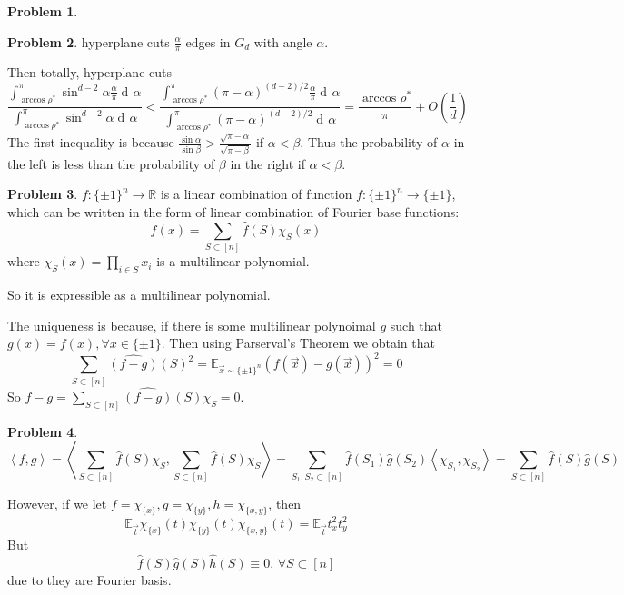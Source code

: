 \documentclass[a4paper]{article}
\theoremstyle{definition}
\newtheorem{problem}{Problem}
\theoremstyle{plain}
\newcommand{\Rbb}{\mathbb R}
\newcommand{\Ebb}{\mathbb E}
\newcommand{\dps}{\displaystyle}
\newcommand{\<}{\left<}
\renewcommand{\>}{\right>}
\numberwithin{equation}{problem}
\DeclareMathOperator{\dd}{d\!}
\begin{document}
\begin{problem}
\end{problem}
\begin{problem}
  hyperplane cuts  $ \frac{\alpha}{\pi} $ edges in  $ G_d $ with angle  $ \alpha $.
  
  Then totally, hyperplane cuts 
  \[\frac{\int_{\arccos\rho^*}^\pi \sin^{d-2}\alpha\frac{\alpha}{\pi}\dd \alpha}{\int_{\arccos\rho^*}^\pi\sin^{d-2}\alpha\dd \alpha}<\frac{\int_{\arccos\rho^*}^\pi(\pi-\alpha)^{(d-2)/2}\frac{\alpha}{\pi}\dd\alpha}{\int_{\arccos\rho^*}^\pi(\pi-\alpha)^{(d-2)/2}\dd \alpha}=\frac{\arccos\rho^*}{\pi}+O(\frac{1}{d})\]
  The first inequality is because  $ \dps\frac{\sin \alpha}{\sin \beta}>\frac{\sqrt{\pi-\alpha}}{\sqrt{\pi-\beta}} $ if  $ \alpha<\beta $. Thus the probability of  $ \alpha $ in the left is less than the probability of  $ \beta $ in the right if  $ \alpha<\beta $.

\end{problem}
\begin{problem}
  $ f:\{\pm 1\}^n\rightarrow \Rbb $ is a linear combination of function  $ f:\{\pm 1\}^n\rightarrow \{\pm 1\} $, which can be written in the form of linear combination of Fourier base functions:
  \[f(x)=\sum_{S\subset [n]}\hat{f}(S)\chi_S(x)\]
  where  $ \dps\chi_S(x)=\prod_{i\in S}x_i $ is a multilinear polynomial.
  
  So it is expressible as a multilinear polynomial.

  The uniqueness is because, if there is some multilinear polynoimal  $ g $ such that  $ g(x)=f(x),\forall x\in\{\pm 1\} $. Then using Parserval's Theorem we obtain that 
  \[\sum_{S\subset [n]}\hat{(f-g)}(S)^2=\Ebb_{\vec{x}\sim\{\pm 1\}^n}(f(\vec{x})-g(\vec{x}))^2=0\]
  So  $ f-g=\dps\sum_{S\subset [n]}\hat{(f-g)}(S)\chi_S=0 $.   
\end{problem}
\begin{problem}
    \[\<f,g\>=\<\sum_{S\subset [n]}\hat{f}(S)\chi_S,\sum_{S\subset [n]}\hat{f}(S)\chi_S\>=\sum_{S_1,S_2\subset [n]}\hat{f}(S_1)\hat{g}(S_2)\<\chi_{S_1},\chi_{S_2}\>=\sum_{S\subset [n]}\hat{f}(S)\hat{g}(S)\]

    However, if we let  $ f=\chi_{\{x\}},g=\chi_{\{y\}},h=\chi_{\{x,y\}} $, then 
    \[\Ebb_{\vec{t}}\chi_{\{x\}}(t)\chi_{\{y\}}(t)\chi_{\{x,y\}}(t)=\Ebb_{\vec{t}}t_x^2t_y^2\]
    But 
    \[\hat{f}(S)\hat{g}(S)\hat{h}(S)\equiv 0,\,\forall S\subset [n]\]
    due to they are Fourier basis.
\end{problem}
\end{document}
